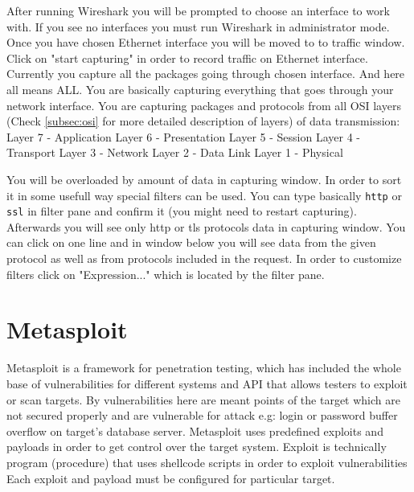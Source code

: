 \documentclass{article}[12pt]
\begin{document}
After running Wireshark you will be prompted to choose an interface to work with.
If you see no interfaces you must run Wireshark in administrator mode.
Once you have chosen Ethernet interface you will be moved to to traffic window.
Click on "start capturing" in order to record traffic on Ethernet interface.
Currently you capture all the packages going through chosen interface.
And here all means ALL.
You are basically capturing everything that goes through your network interface.
You are capturing packages and protocols from all OSI layers (Check \ref{subsec:osi} for more detailed description of layers) of data transmission: \newline \newline
Layer 7 - Application \newline
Layer 6 - Presentation \newline
Layer 5 - Session \newline
Layer 4 - Transport \newline
Layer 3 - Network \newline
Layer 2 - Data Link \newline
Layer 1 - Physical \newline


You will be overloaded by amount of data in capturing window.
In order to sort it in some usefull way special filters can be used.
You can type basically \texttt{http} or \texttt{ssl} in filter pane and confirm it (you might need to restart capturing).
Afterwards you will see only http or tls protocols data in capturing window.
You can click on one line and in window below you will see data from the given protocol as well as from protocols included in the request.
In order to customize filters click on "Expression..." which is located by the filter pane.








\section{Metasploit}
Metasploit is a framework for penetration testing, which has included the whole base of vulnerabilities for different systems and API that allows testers to exploit or scan targets.
By vulnerabilities here are meant points of the target which are not secured properly and are vulnerable for attack e.g:
login or password buffer overflow on target's database server.
Metasploit uses predefined exploits and payloads in order to get control over the target system.
Exploit is technically program (procedure) that uses shellcode scripts in order to exploit vulnerabilities Each exploit and payload must be configured for particular target.
\end{document}
